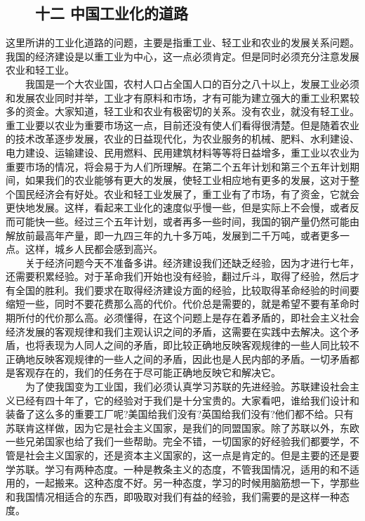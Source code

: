 \documentclass[cn,11pt,chinese]{elegantbook}
\def\myformat#1{\hfil\hfil #1}
\begin{document}
\subsection*{\myformat{　　十二 中国工业化的道路}}
这里所讲的工业化道路的问题，主要是指重工业、轻工业和农业的发展关系问题。我国的经济建设是以重工业为中心，这一点必须肯定。但是同时必须充分注意发展农业和轻工业。\\
　　我国是一个大农业国，农村人口占全国人口的百分之八十以上，发展工业必须和发展农业同时并举，工业才有原料和市场，才有可能为建立强大的重工业积累较多的资金。大家知道，轻工业和农业有极密切的关系。没有农业，就没有轻工业。重工业要以农业为重要市场这一点，目前还没有使人们看得很清楚。但是随着农业的技术改革逐步发展，农业的日益现代化，为农业服务的机械、肥料、水利建设、电力建设、运输建设、民用燃料、民用建筑材料等等将日益增多，重工业以农业为重要市场的情况，将会易于为人们所理解。在第二个五年计划和第三个五年计划期间，如果我们的农业能够有更大的发展，使轻工业相应地有更多的发展，这对于整个国民经济会有好处。农业和轻工业发展了，重工业有了市场，有了资金，它就会更快地发展。这样，看起来工业化的速度似乎慢一些，但是实际上不会慢，或者反而可能快一些。经过三个五年计划，或者再多一些时间，我国的钢产量仍然可能由解放前最高年产量，即一九四三年的九十多万吨，发展到二千万吨，或者更多一点。这样，城乡人民都会感到高兴。\\
　　关于经济问题今天不准备多讲。经济建设我们还缺乏经验，因为才进行七年，还需要积累经验。对于革命我们开始也没有经验，翻过斤斗，取得了经验，然后才有全国的胜利。我们要求在取得经济建设方面的经验，比较取得革命经验的时间要缩短一些，同时不要花费那么高的代价。代价总是需要的，就是希望不要有革命时期所付的代价那么高。必须懂得，在这个问题上是存在着矛盾的，即社会主义社会经济发展的客观规律和我们主观认识之间的矛盾，这需要在实践中去解决。这个矛盾，也将表现为人同人之间的矛盾，即比较正确地反映客观规律的一些人同比较不正确地反映客观规律的一些人之间的矛盾，因此也是人民内部的矛盾。一切矛盾都是客观存在的，我们的任务在于尽可能正确地反映它和解决它。\\
　　为了使我国变为工业国，我们必须认真学习苏联的先进经验。苏联建设社会主义已经有四十年了，它的经验对于我们是十分宝贵的。大家看吧，谁给我们设计和装备了这么多的重要工厂呢?美国给我们没有?英国给我们没有?他们都不给。只有苏联肯这样做，因为它是社会主义国家，是我们的同盟国家。除了苏联以外，东欧一些兄弟国家也给了我们一些帮助。完全不错，一切国家的好经验我们都要学，不管是社会主义国家的，还是资本主义国家的，这一点是肯定的。但是主要的还是要学苏联。学习有两种态度。一种是教条主义的态度，不管我国情况，适用的和不适用的，一起搬来。这种态度不好。另一种态度，学习的时候用脑筋想一下，学那些和我国情况相适合的东西，即吸取对我们有益的经验，我们需要的是这样一种态度。\\
\end{document}
